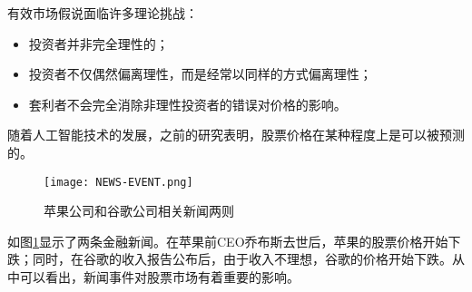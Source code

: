 有效市场假说面临许多理论挑战：
\begin{itemize}
	\item 投资者并非完全理性的；
	\item 投资者不仅偶然偏离理性，而是经常以同样的方式偏离理性；
	\item 套利者不会完全消除非理性投资者的错误对价格的影响。
\end{itemize}
随着人工智能技术的发展，之前的研究表明，股票价格在某种程度上是可以被预测的。
\begin{figure}[ht]
	\centering 
	\texttt{[image: NEWS-EVENT.png]}
	\caption{苹果公司和谷歌公司相关新闻两则}
	\label{fig:stock-event}
\end{figure}
如图\ref{fig:stock-event}显示了两条金融新闻。在苹果前CEO乔布斯去世后，苹果的股票价格开始下跌；同时，在谷歌的收入报告公布后，由于收入不理想，谷歌的价格开始下跌。从中可以看出，新闻事件对股票市场有着重要的影响。

